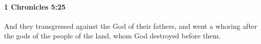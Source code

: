 
		\paragraph{1 Chronicles 5:25} %
			\label{1CHRONICLES-5-25}

			And they transgressed against the God of their fathers, and went a whoring after the gods of the people of the land, whom God destroyed before them.


